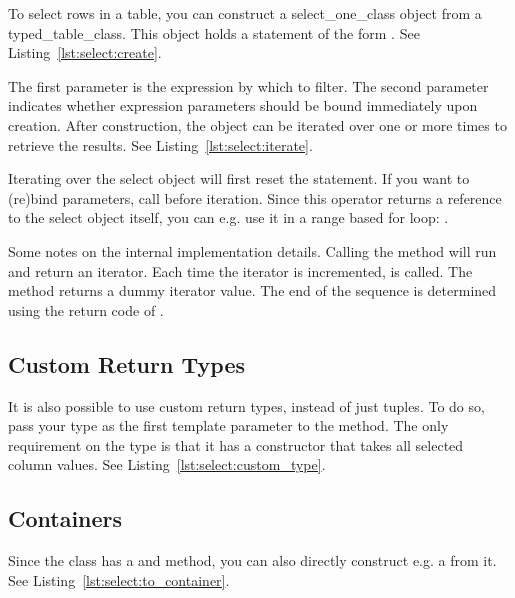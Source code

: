 To select rows in a table, you can construct a \gls{select_one_class} object from a \gls{typed_table_class}. This object holds a statement of the form \newline {}. See Listing~\ref{lst:select:create}.



The first parameter is the expression by which to filter. The second parameter indicates whether expression parameters should be bound immediately upon creation. After construction, the object can be iterated over one or more times to retrieve the results. See Listing~\ref{lst:select:iterate}.



Iterating over the select object will first reset the statement. If you want to (re)bind parameters, call  before iteration. Since this operator returns a reference to the select object itself, you can e.g. use it in a range based for loop: .

Some notes on the internal implementation details. Calling the  method will run  and return an iterator. Each time the iterator is incremented,  is called. The  method returns a dummy iterator value. The end of the sequence is determined using the return code of .

\subsection{Custom Return Types}
\label{section:select:custom}

It is also possible to use custom return types, instead of just tuples. To do so, pass your type as the first template parameter to the  method. The only requirement on the type is that it has a constructor that takes all selected column values. See Listing~\ref{lst:select:custom_type}.



\subsection{Containers}
\label{section:select:container}

Since the  class has a  and  method, you can also directly construct e.g. a  from it. See Listing~\ref{lst:select:to_container}.



